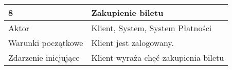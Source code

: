 \begin{tabularx}{\textwidth}{|l|X|}
\hline
8                      & Zakupienie biletu                                                                                                                                                                                                                                                                                                                                                                                                                                                                                                                                                                                                                                                                                                                                                                                \\ \hline
Aktor                  & Klient, System, System Płatności \\ \hline
Warunki początkowe     & Klient jest zalogowany.                                                                                                                                                                                                                                                                                                                                                                                                                                                                                                                                                                                                                                                                                                                                                                     \\ \hline
Zdarzenie inicjujące   & Klient wyraża chęć zakupienia biletu                                                                                                                                                                                                                                                                                                                                                                                                                                                                                                                                                                                                                                                                                                                                                        \\ \hline

\end{tabularx}
